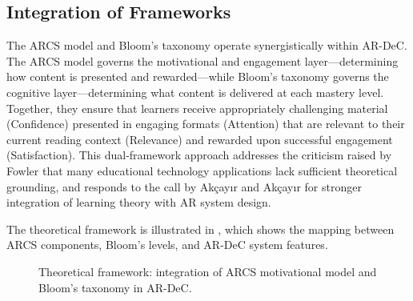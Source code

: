 \subsection{Integration of Frameworks}
\label{subsec:framework_integration}

The ARCS model and Bloom's taxonomy operate synergistically within AR-DeC. The ARCS model governs the motivational and engagement layer---determining how content is presented and rewarded---while Bloom's taxonomy governs the cognitive layer---determining what content is delivered at each mastery level. Together, they ensure that learners receive appropriately challenging material (Confidence) presented in engaging formats (Attention) that are relevant to their current reading context (Relevance) and rewarded upon successful engagement (Satisfaction). This dual-framework approach addresses the criticism raised by Fowler \cite{fowler2015} that many educational technology applications lack sufficient theoretical grounding, and responds to the call by Ak\c{c}ay{\i}r and Ak\c{c}ay{\i}r \cite{akccayir2017} for stronger integration of learning theory with AR system design.

The theoretical framework is illustrated in , which shows the mapping between ARCS components, Bloom's levels, and AR-DeC system features.

\begin{figure}[htbp]
    \centering
    
    \caption{Theoretical framework: integration of ARCS motivational model and Bloom's taxonomy in AR-DeC.}
    \label{fig:framework}
\end{figure}
